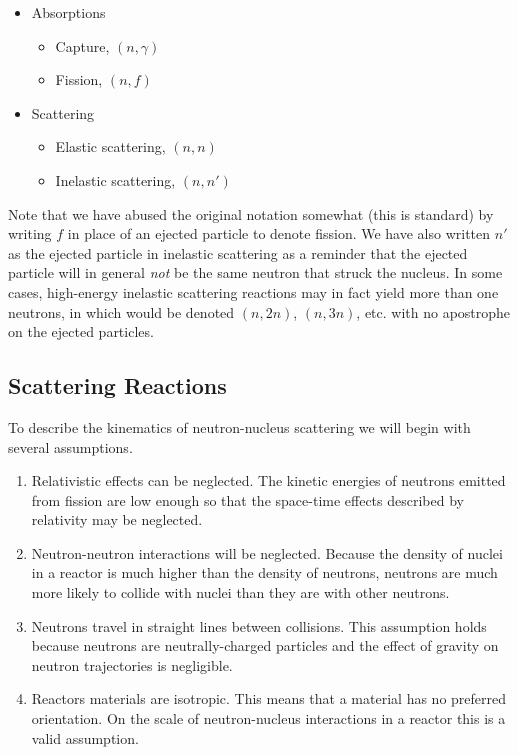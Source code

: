 \documentclass[11pt]{article}
\begin{document}
\begin{itemize}
\item Absorptions
\begin{itemize}
\item Capture, \((n,\gamma)\)
\item Fission, \((n,f)\)
\end{itemize}
\item Scattering
\begin{itemize}
\item Elastic scattering, \((n,n)\)
\item Inelastic scattering, \((n,n')\)
\end{itemize}
\end{itemize}

Note that we have abused the original notation somewhat (this is standard) by writing \(f\) in place of an ejected particle to denote fission.  We have also written \(n'\) as the ejected particle in inelastic scattering as a reminder that the ejected particle will in general \emph{not} be the same neutron that struck the nucleus.  In some cases, high-energy inelastic scattering reactions may in fact yield more than one neutrons, in which would be denoted \((n,2n)\), \((n,3n)\), etc. with no apostrophe on the ejected particles.

\subsection{Scattering Reactions}
\label{sec:orgheadline8}
To describe the kinematics of neutron-nucleus scattering we will begin with several assumptions.
\begin{enumerate}
\item Relativistic effects can be neglected.  The kinetic energies of neutrons emitted from fission are low enough so that the space-time effects described by relativity may be neglected.
\item Neutron-neutron interactions will be neglected.  Because the density of nuclei in a reactor is much higher than the density of neutrons, neutrons are much more likely to collide with nuclei than they are with other neutrons.
\item Neutrons travel in straight lines between collisions.  This assumption holds because neutrons are neutrally-charged particles and the effect of gravity on neutron trajectories is negligible.
\item Reactors materials are isotropic.  This means that a material has no preferred orientation.  On the scale of neutron-nucleus interactions in a reactor this is a valid assumption.
\end{enumerate}
\end{document}
